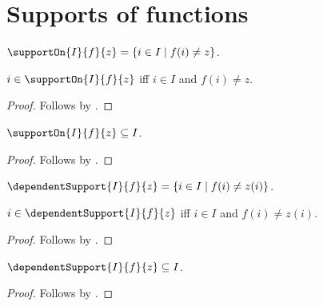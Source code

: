




\section{Supports of functions}

\begin{definition}\label{support_on}
    $\supportOn{I}{f}{z}=\{i\in I\mid f(i)\neq z\}$.
\end{definition}

\begin{proposition}\label{support_on_iff}
    $i\in\supportOn{I}{f}{z}$ iff $i\in I$ and $f(i)\neq z$.
\end{proposition}
\begin{proof}
    Follows by .
\end{proof}

\begin{proposition}\label{support_on_subseteq}
    $\supportOn{I}{f}{z}\subseteq I$.
\end{proposition}
\begin{proof}
    Follows by .
\end{proof}

\begin{definition}\label{dependent_support}
    $\dependentSupport{I}{f}{z}
        =\{i\in I\mid f(i)\neq z(i)\}$.
\end{definition}

\begin{proposition}\label{dependent_support_iff}
    $i\in\dependentSupport{I}{f}{z}$ iff
        $i\in I$ and $f(i)\neq z(i)$.
\end{proposition}
\begin{proof}
    Follows by .
\end{proof}

\begin{proposition}\label{dependent_support_subseteq}
    $\dependentSupport{I}{f}{z}\subseteq I$.
\end{proposition}
\begin{proof}
    Follows by .
\end{proof}

